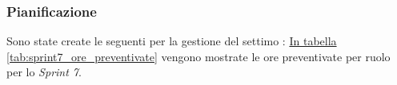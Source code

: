 \subsubsection{Pianificazione}
\label{sec:sprint7_pianificazione}
Sono state create le seguenti  per la gestione del settimo : 
\hyperref[tab:sprint7_ore_preventivate]{In tabella \ref{tab:sprint7_ore_preventivate}} vengono mostrate le ore preventivate per ruolo per lo \textit{Sprint 7}.

\begin{table}[H]
    \centering
    \caption{Ore preventivate per ruolo Sprint 7}
    \label{tab:sprint7_ore_preventivate}
\end{table}